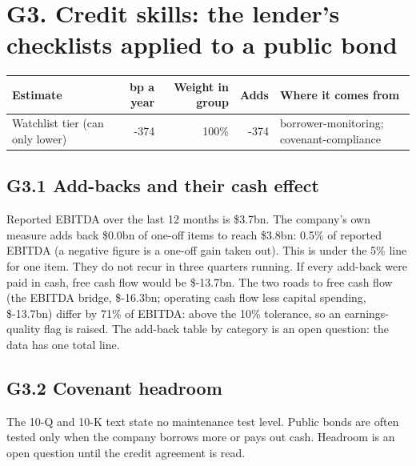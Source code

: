 \documentclass[11pt,a4paper]{article}
\begin{document}
\section*{G3. Credit skills: the lender's checklists applied to a public bond}
\par\noindent{}
\begin{center}\footnotesize\setlength{\tabcolsep}{3.5pt}\begin{tabular}{@{}p{6.2cm}rrrp{4.2cm}@{}}\toprule
Estimate & bp a year & Weight in group & Adds & Where it comes from \\\midrule
Watchlist tier (can only lower) & -374 & 100\% & -374 & borrower-monitoring; covenant-compliance \\
\bottomrule\end{tabular}\end{center}
\subsection*{G3.1 Add-backs and their cash effect}
Reported EBITDA over the last 12 months is \$3.7bn. The company's own measure adds back \$0.0bn of one-off items to reach \$3.8bn: 0.5\% of reported EBITDA (a negative figure is a one-off gain taken out). This is under the 5\% line for one item. They do not recur in three quarters running. If every add-back were paid in cash, free cash flow would be \$-13.7bn. The two roads to free cash flow (the EBITDA bridge, \$-16.3bn; operating cash flow less capital spending, \$-13.7bn) differ by 71\% of EBITDA: above the 10\% tolerance, so an earnings-quality flag is raised. The add-back table by category is an open question: the data has one total line.
\subsection*{G3.2 Covenant headroom}
The 10-Q and 10-K text state no maintenance test level. Public bonds are often tested only when the company borrows more or pays out cash. Headroom is an open question until the credit agreement is read.
\end{document}
